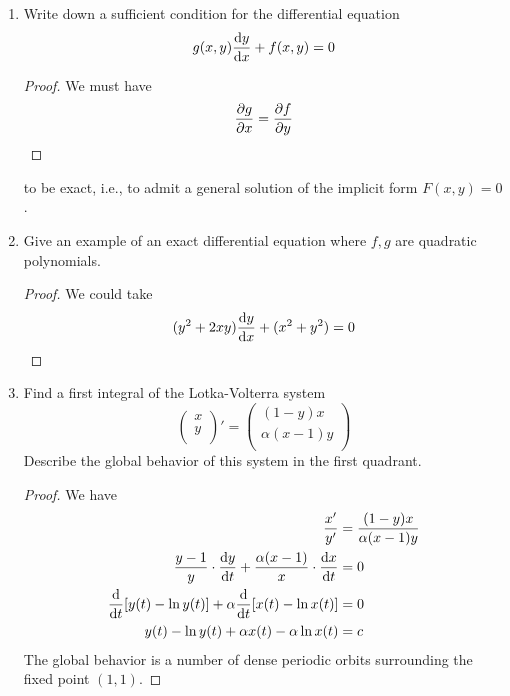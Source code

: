 \documentclass[../psets.tex]{subfiles}
\begin{document}
\begin{enumerate}
\begin{proof}
    \end{proof}
    \item Write down a sufficient condition for the differential equation
    \begin{equation*}
        g(x,y)\dv{y}{x}+f(x,y) = 0
    \end{equation*}
    \begin{proof}
        We must have
        \begin{equation*}
            \pdv{g}{x} = \pdv{f}{y}
        \end{equation*}
    \end{proof}
    to be exact, i.e., to admit a general solution of the implicit form $F(x,y)=0$.
    \item Give an example of an exact differential equation where $f,g$ are quadratic polynomials.
    \begin{proof}
        We could take
        \begin{equation*}
            (y^2+2xy)\dv{y}{x}+(x^2+y^2) = 0
        \end{equation*}
    \end{proof}
    \item Find a first integral of the Lotka-Volterra system
    \begin{equation*}
        \begin{pmatrix}
            x\\
            y\\
        \end{pmatrix}'
        =
        \begin{pmatrix}
            (1-y)x\\
            \alpha(x-1)y\\
        \end{pmatrix}
    \end{equation*}
    Describe the global behavior of this system in the first quadrant.
    \begin{proof}
        We have
        \begin{align*}
            \frac{x'}{y'} &= \frac{(1-y)x}{\alpha(x-1)y}\\
            \frac{y-1}{y}\cdot\dv{y}{t}+\frac{\alpha(x-1)}{x}\cdot\dv{x}{t} &= 0\\
            \dv{t}[y(t)-\ln y(t)]+\alpha\dv{t}[x(t)-\ln x(t)] &= 0\\
            y(t)-\ln y(t)+\alpha x(t)-\alpha\ln x(t) &= c
        \end{align*}
        The global behavior is a number of dense periodic orbits surrounding the fixed point $(1,1)$.

\end{proof}
\end{enumerate}
\end{document}
